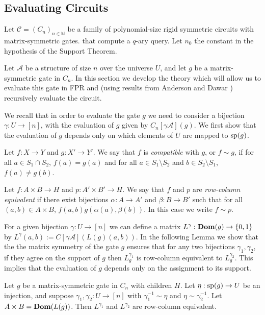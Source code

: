\documentclass[../paper.tex]{subfiles}
\begin{document}
\subsection {Evaluating Circuits}
Let $\mathcal{C} = (C_n)_{n \in \mathbb{N}}$ be a family of polynomial-size
rigid symmetric circuits with matrix-symmetric gates. that compute a $q$-ary
query. Let $n_0$ the constant in the hypothesis of the Support Theorem.

Let $\mathcal{A}$ be a structure of size $n$ over the universe $U$, and let $g$
be a matrix-symmetric gate in $C_n$. In this section we develop the theory which
will allow us to evaluate this gate in FPR and (using results from Anderson and
Dawar \cite{}) recursively evaluate the circuit.

We recall that in order to evaluate the gate $g$ we need to consider a bijection
$\gamma: U \rightarrow [n]$, with the evaluation of $g$ given by $C_n[\gamma
\mathcal{A}](g)$. We first show that the evaluation of $g$ depends only on which
elements of $U$ are mapped to $\text{sp}(g)$.

\begin{definition}
  Let $f: X \rightarrow Y$ and $g : X' \rightarrow Y'$. We say that $f$ is
  \emph{compatible} with $g$, or $f \sim g$, if for all $a \in S_1 \cap S_2$,
  $f(a) = g(a)$ and for all $a \in S_1 \setminus S_2$ and $b \in S_2 \setminus
  S_1$, $f(a) \neq g(b)$.
\end{definition}

\begin{definition}
  Let $f: A \times B \rightarrow H$ and $p: A' \times B' \rightarrow H$. We say
  that $f$ and $p$ are \emph{row-column equivalent} if there exist bijections
  $\alpha: A \rightarrow A'$ and $\beta: B \rightarrow B'$ such that for all
  $(a, b) \in A \times B$, $f(a,b)g(\alpha(a), \beta(b))$. In this case we write
  $f \sim p$.
\end{definition}

For a given bijection $\gamma: U \rightarrow [n]$ we can define a matrix
$L^{\gamma} : \text{\textbf{Dom}} (g) \rightarrow \{0,1\}$ by $L^{\gamma} (a,b) := C[\gamma
\mathcal{A}](L(g)(a,b))$. In the following Lemma we show that the the matrix
symmetry of the gate $g$ ensures that for any two bijections $\gamma_1,
\gamma_2$, if they agree on the support of $g$ then $L^{\gamma_1}_g$ is
row-column equivalent to $L^{\gamma_2}_g$. This implies that the evaluation of
$g$ depends only on the assignment to its support.

\begin{lem}
  Let $g$ be a matrix-symmetric gate in $C_n$ with children $H$. Let $\eta:
  \text{sp}(g) \rightarrow U$ be an injection, and suppose $\gamma_1, \gamma_2: U
  \rightarrow [n]$ with $\gamma^{-1}_1 \sim \eta$ and $\eta \sim \gamma^{-1}_2$.
  Let $A \times B = \text{\textbf{Dom}} (L(g))$. Then $L^{\gamma_1}$ and $L^{\gamma_2}$ are
  row-column equivalent.
\end{lem}
\end{document}
